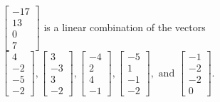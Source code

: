 \begin{exercise}
\begin{exerciseStatement}
  \end{exerciseStatement}
  \begin{exerciseAnswer}
   \(\left[\begin{array}{c}
-17 \\
13 \\
0 \\
7
\end{array}\right]\) 
  	 is  
	a linear combination of the vectors \(\left[\begin{array}{c}
4 \\
-2 \\
-5 \\
-2
\end{array}\right] , \left[\begin{array}{c}
3 \\
-3 \\
3 \\
-2
\end{array}\right] , \left[\begin{array}{c}
-4 \\
2 \\
4 \\
-1
\end{array}\right] , \left[\begin{array}{c}
-5 \\
1 \\
-1 \\
-2
\end{array}\right] , \text{ and } \left[\begin{array}{c}
-1 \\
-2 \\
-2 \\
0
\end{array}\right]\).

	
  


  \end{exerciseAnswer}
\end{exercise}